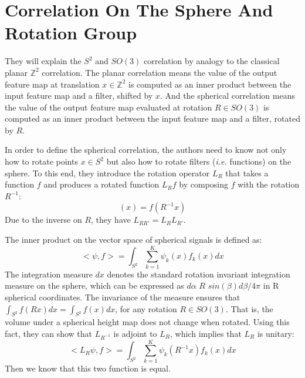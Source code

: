 \documentclass[10pt,twocolumn,letterpaper]{article}
\begin{document}
\section{Correlation On The Sphere And Rotation Group}
They will explain the $S^2$ and $SO(3)$ correlation by analogy to the classical planar $\mathbb{Z}^2$ correlation. The planar correlation means the value of the output feature map at translation $x\in\mathbb{Z}^2$ is computed as an inner product between the input feature map and a filter, shifted by $x$. And the spherical correlation means the value of the output feature map evaluated at rotation $R\in{SO(3)}$ is computed as an inner product between the input feature map and a filter, rotated by $R$.
\par In order to define the spherical correlation, the authors need to know not only how to rotate points $x\in{S^2}$ but also how to rotate filters (\emph{i.e.} functions) on the sphere. To this end, they introduce the rotation operator $L_R$ that takes a function $f$ and produces a rotated function $L_R{f}$ by composing $f$ with the rotation $R^{-1}$:
\begin{equation}
[L_R{f}](x)=f(R^{-1}x)
\end{equation}\label{2}
Due to the inverse on $R$, they have $L_{RR'}=L_{R}L_{R'}$.
\par The inner product on the vector space of spherical signals is defined as:
\begin{equation}
<\psi,f>=\int_{S^2}\sum_{k=1}^{K}\psi_{k}(x)f_k(x)dx
\end{equation}\label{Eq3}
The integration measure $dx$ denotes the standard rotation invariant integration measure on the sphere, which can be expressed as $d\alpha$ $R$ $sin(\beta)d\beta/4\pi$ in R spherical coordinates. The invariance of the measure ensures that $\int_{S^2}f(Rx)dx=\int_{S^2}f(x)dx$, for any rotation $R\in{SO(3)}$. That is, the volume under a spherical height map does not change when rotated. Using this fact, they can show that $L_{R^{-1}}$ is adjoint to $L_R$, which implies that $L_R$ is unitary:
\begin{equation}
<L_R{\psi},f>=\int_{S^2}\sum_{k=1}^{K}\psi_k(R^{-1}x)f_{k}(x)dx
\end{equation}\label{E}
Then we know that this two function is equal.


\end{document}
